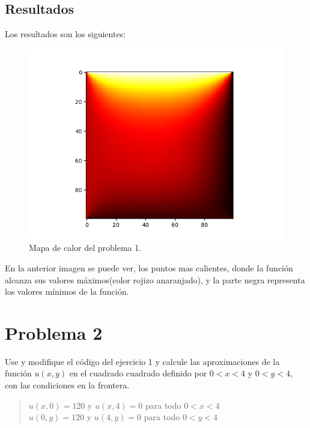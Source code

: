 \documentclass[a4paper,12pt]{article}
\newcommand{\eq}[1]{$#1$}
\begin{document}
    \subsection{Resultados}
        Los resultados son los siguientes:
        \begin{figure}[h]
            \centering
            \includegraphics[scale=0.7]{ejer1_demostr.png}
            \caption{Mapa de calor del problema 1.}
        \end{figure}

        En la anterior imagen se puede ver, los puntos mas calientes, donde 
        la función alcanza sus valores máximos(color rojizo anaranjado),
        y la parte negra representa los valores mínimos de la función.
    \section{Problema 2}
    Use y modifique el código del ejercicio 1 y calcule las aproximaciones
    de la función \eq{u(x, y)} en el cuadrado cuadrado definido por \eq{0 < x < 4} y
    \eq{0 < y < 4}, con las condiciones en la frontera.
    \begin{quote}
        \centering
        \eq{u(x,0) = 120} y \eq{u(x,4) = 0} para todo \eq{0 < x < 4}\\
        \eq{u(0,y) = 120} y \eq{u(4,y) = 0} para todo \eq{0 < y < 4}
    \end{quote}
\end{document}
